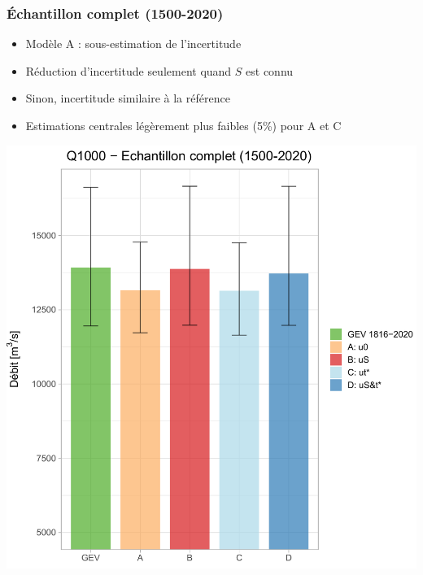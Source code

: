 \documentclass[compress,9pt]{beamer}
\begin{document}
	
	\begin{frame}[c]
		\frametitle{Échantillon complet (1500-2020)}
		\begin{minipage}{0.39\textwidth}
			\centering
			\begin{itemize}
				\item<1-> [$\vartriangleright$] Modèle A : sous-estimation de l'incertitude
				\vfill
				\item<2-> [$\vartriangleright$] Réduction d'incertitude seulement quand $S$ est connu 
				\vfill
				\item<3-> [$\vartriangleright$] Sinon, incertitude similaire à la référence
				\vfill
				\item<4-> [$\vartriangleright$] Estimations centrales légèrement plus faibles (5\%) pour A et C
			\end{itemize}
		\end{minipage}
		\begin{minipage}{0.6\textwidth}
			\begin{center}
				\includegraphics[width = .9\textwidth]{./Figures/BarplotC4Full.pdf} 
			\end{center}
		\end{minipage}
	\end{frame}
	
\end{document}

